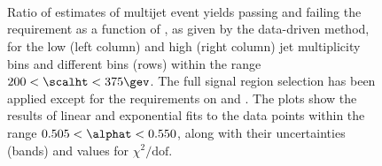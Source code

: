 \begin{figure}[!h]
  \centering
   \\
   \\
   \\
  \caption{Ratio of estimates of multijet event yields passing and
    failing the \mhtmet requirement as a function of \alphat, as given
    by the data-driven method, for the low (left column) and high
    (right column) jet multiplicity bins and different \scalht bins
    (rows) within the range $200 < \scalht < 375\gev$. The full signal
    region selection has been applied except for the requirements on
    \mhtmet and \alphat. The plots show the results of linear and
    exponential fits to the data points within the range $0.505 <
    \alphat < 0.550$, along with their uncertainties (bands) and
    values for $\chi^2 / \textrm{dof}$.}
  \label{fig:}
\end{figure}



